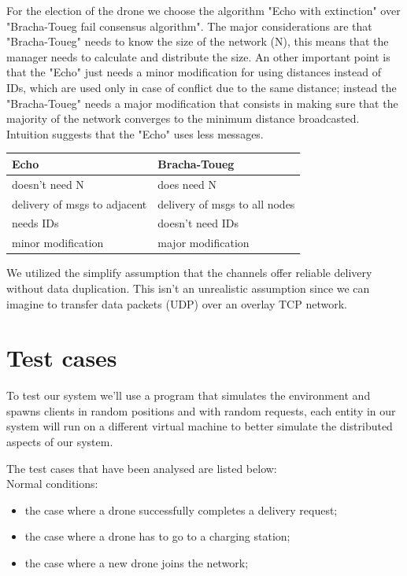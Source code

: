 \documentclass[a4paper, oneside]{memoir}
\begin{document}
For the election of the drone we choose the algorithm "Echo with extinction" over "Bracha-Toueg fail consensus algorithm". The major considerations are that "Bracha-Toueg" needs to know the size of the network (N), this means that the manager needs to calculate and distribute the size. An other important point is that the "Echo" just needs a minor modification for using distances instead of IDs, which are used only in case of conflict due to the same distance; instead the "Bracha-Toueg" needs a major modification that consists in making sure that the majority of the network converges to the minimum distance broadcasted. Intuition suggests that the "Echo" uses less messages.

\begin{table}[h!]
	\centering
	\begin{tabular} {l|l}
		\hline
		Echo & Bracha-Toueg \\
		\hline
		\hline
		doesn't need N		& does need N 			\\
		delivery of msgs to adjacent	& delivery of msgs to all nodes \\
		needs IDs			& doesn't need IDs		\\
		minor modification 	& major modification	\\
		\hline
	\end{tabular}
\end{table}

We utilized the simplify assumption that the channels offer reliable delivery without data duplication. This isn't an unrealistic assumption since we can imagine to transfer data packets (UDP) over an overlay TCP network.

\section{Test cases}

To test our system we'll use a program that simulates the environment and spawns clients in random positions and with random requests, each entity in our system will run on a different virtual machine to better simulate the distributed aspects of our system.

The test cases that have been analysed are listed below:\\

Normal conditions:
\begin{itemize}
	\item the case where a drone successfully completes a delivery request;
	\item the case where a drone has to go to a charging station;
	\item the case where a new drone joins the network;
\end{itemize}
\end{document}
